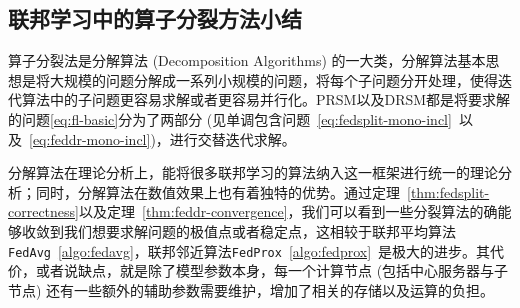 \subsection{联邦学习中的算子分裂方法小结}
\label{subsec:chap2-os-summarize}

算子分裂法是分解算法 (Decomposition Algorithms) 的一大类，分解算法基本思想是将大规模的问题分解成一系列小规模的问题，将每个子问题分开处理，使得迭代算法中的子问题更容易求解或者更容易并行化。PRSM以及DRSM都是将要求解的问题\ref{eq:fl-basic}分为了两部分 (见单调包含问题~\eqref{eq:fedsplit-mono-incl}~以及~\eqref{eq:feddr-mono-incl})，进行交替迭代求解。

分解算法在理论分析上，能将很多联邦学习的算法纳入这一框架进行统一的理论分析；同时，分解算法在数值效果上也有着独特的优势。通过定理~\ref{thm:fedsplit-correctness}以及定理~\ref{thm:feddr-convergence}，我们可以看到一些分裂算法的确能够收敛到我们想要求解问题的极值点或者稳定点，这相较于联邦平均算法\texttt{FedAvg}~\ref{algo:fedavg}，联邦邻近算法\texttt{FedProx}~\ref{algo:fedprox}~是极大的进步。其代价，或者说缺点，就是除了模型参数本身，每一个计算节点 (包括中心服务器与子节点) 还有一些额外的辅助参数需要维护，增加了相关的存储以及运算的负担。
